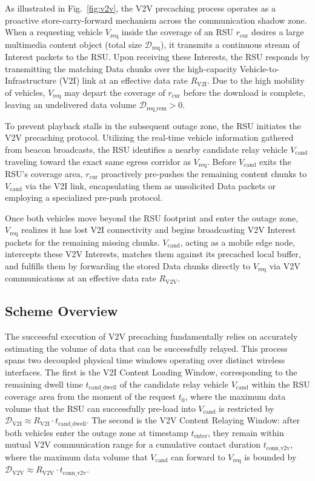 \documentclass[journal]{IEEEtran}
\begin{document}
As illustrated in Fig.~\ref{fig:v2v}, the V2V precaching process operates as a proactive store-carry-forward mechanism across the communication shadow zone. When a requesting vehicle $V_{\text{req}}$ inside the coverage of an RSU $r_{\text{cur}}$ desires a large multimedia content object (total size $\mathcal{D}_{\text{req}}$), it transmits a continuous stream of Interest packets to the RSU. Upon receiving these Interests, the RSU responds by transmitting the matching Data chunks over the high-capacity Vehicle-to-Infrastructure (V2I) link at an effective data rate $R_{\text{V2I}}$. Due to the high mobility of vehicles, $V_{\text{req}}$ may depart the coverage of $r_{\text{cur}}$ before the download is complete, leaving an undelivered data volume $\mathcal{D}_{\text{req\_rem}} > 0$. 

To prevent playback stalls in the subsequent outage zone, the RSU initiates the V2V precaching protocol. Utilizing the real-time vehicle information gathered from beacon broadcasts, the RSU identifies a nearby candidate relay vehicle $V_{\text{cand}}$ traveling toward the exact same egress corridor as $V_{\text{req}}$. Before $V_{\text{cand}}$ exits the RSU's coverage area, $r_{\text{cur}}$ proactively pre-pushes the remaining content chunks to $V_{\text{cand}}$ via the V2I link, encapsulating them as unsolicited Data packets or employing a specialized pre-push protocol. 

Once both vehicles move beyond the RSU footprint and enter the outage zone, $V_{\text{req}}$ realizes it has lost V2I connectivity and begins broadcasting V2V Interest packets for the remaining missing chunks. $V_{\text{cand}}$, acting as a mobile edge node, intercepts these V2V Interests, matches them against its precached local buffer, and fulfills them by forwarding the stored Data chunks directly to $V_{\text{req}}$ via V2V communications at an effective data rate $R_{\text{V2V}}$.

\subsection{Scheme Overview}\label{sec:overview}
The successful execution of V2V precaching fundamentally relies on accurately estimating the volume of data that can be successfully relayed. This process spans two decoupled physical time windows operating over distinct wireless interfaces. The first is the V2I Content Loading Window, corresponding to the remaining dwell time $t_{\text{cand\_dwell}}$ of the candidate relay vehicle $V_{\text{cand}}$ within the RSU coverage area from the moment of the request $t_0$, where the maximum data volume that the RSU can successfully pre-load into $V_{\text{cand}}$ is restricted by $\mathcal{D}_{\text{V2I}} \approx R_{\text{V2I}} \cdot t_{\text{cand\_dwell}}$. The second is the V2V Content Relaying Window: after both vehicles enter the outage zone at timestamp $t_{\text{enter}}$, they remain within mutual V2V communication range for a cumulative contact duration $t_{\text{conn\_v2v}}$, where the maximum data volume that $V_{\text{cand}}$ can forward to $V_{\text{req}}$ is bounded by $\mathcal{D}_{\text{V2V}} \approx R_{\text{V2V}} \cdot t_{\text{conn\_v2v}}$.
\end{document}
